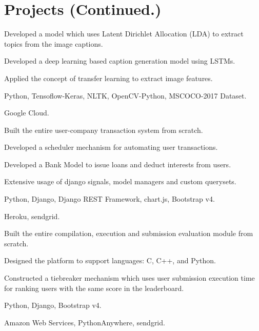 \section{Projects \small{(Continued.)}}

 \vspace{0.1in}
\begin{tightemize}
\item Developed a model which uses Latent Dirichlet Allocation (LDA) to extract topics from the image captions.
\item Developed a  deep learning based caption generation model using LSTMs.
\item Applied the concept of transfer learning to extract image features.
\item {} Python, Tensoflow-Keras, NLTK, OpenCV-Python, MSCOCO-2017 Dataset.
\item {} Google Cloud.
\end{tightemize}
\sectionsep

\begin{tightemize}
\item Built the entire user-company transaction system from scratch.
\item Developed a scheduler mechanism for automating user transactions.
\item Developed a Bank Model to issue loans and deduct interests from users.
\item Extensive usage of django signals, model managers and custom querysets.
\item {} Python, Django, Django REST Framework, chart.js, Bootstrap v4.
\item {} Heroku, sendgrid.
\end{tightemize}
\sectionsep

\begin{tightemize}
\item Built the entire compilation, execution and submission evaluation module from scratch.
\item Designed the platform to support languages: C, C++, and Python.
\item Constructed a tiebreaker mechanism which uses user submission execution time for ranking users with the same score in the leaderboard.
\item {} Python, Django, Bootstrap v4.
\item {} Amazon Web Services, PythonAnywhere, sendgrid.
\end{tightemize}
\sectionsep

